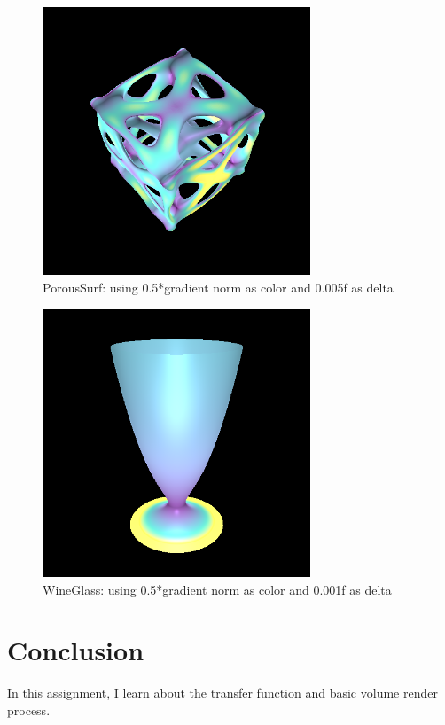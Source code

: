 \documentclass[acmtog]{acmart}
\begin{document}
\begin{figure}[h]
        \centering
        \includegraphics[width=8cm,height=8cm]{porous_surf.png}
        \caption{PorousSurf: using 0.5*gradient norm as color and 0.005f as delta}
\end{figure}

\begin{figure}[h]
        \centering
        \includegraphics[width=8cm,height=8cm]{wineglass.png}
        \caption{WineGlass: using 0.5*gradient norm as color and 0.001f as delta}
\end{figure}

\section{Conclusion}

In this assignment, I learn about the transfer function and basic volume render process.
\end{document}
